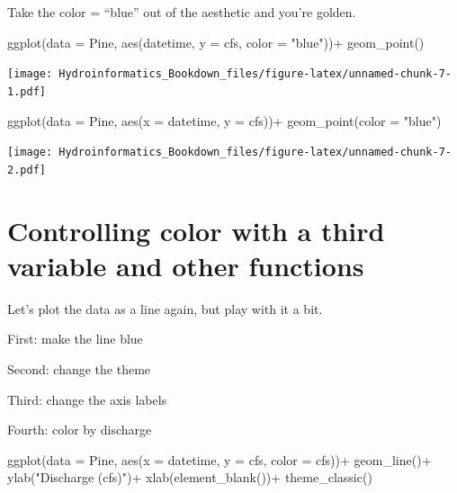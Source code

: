 \documentclass[
]{book}
\newenvironment{Shaded}{\begin{snugshade}}{\end{snugshade}}
\newcommand{\AttributeTok}[1]{\textcolor[rgb]{0.77,0.63,0.00}{#1}}
\newcommand{\FunctionTok}[1]{\textcolor[rgb]{0.00,0.00,0.00}{#1}}
\newcommand{\NormalTok}[1]{#1}
\newcommand{\SpecialCharTok}[1]{\textcolor[rgb]{0.00,0.00,0.00}{#1}}
\newcommand{\StringTok}[1]{\textcolor[rgb]{0.31,0.60,0.02}{#1}}
\begin{document}
Take the color = ``blue'' out of the aesthetic and you're golden.

\begin{Shaded}
\begin{Highlighting}[]
\FunctionTok{ggplot}\NormalTok{(}\AttributeTok{data =}\NormalTok{ Pine, }\FunctionTok{aes}\NormalTok{(datetime, }\AttributeTok{y =}\NormalTok{ cfs, }\AttributeTok{color =} \StringTok{"blue"}\NormalTok{))}\SpecialCharTok{+}
  \FunctionTok{geom\_point}\NormalTok{()}
\end{Highlighting}
\end{Shaded}

\texttt{[image: Hydroinformatics\_Bookdown\_files/figure-latex/unnamed-chunk-7-1.pdf]}

\begin{Shaded}
\begin{Highlighting}[]
\FunctionTok{ggplot}\NormalTok{(}\AttributeTok{data =}\NormalTok{ Pine, }\FunctionTok{aes}\NormalTok{(}\AttributeTok{x =}\NormalTok{ datetime, }\AttributeTok{y =}\NormalTok{ cfs))}\SpecialCharTok{+}
  \FunctionTok{geom\_point}\NormalTok{(}\AttributeTok{color =} \StringTok{"blue"}\NormalTok{)}
\end{Highlighting}
\end{Shaded}

\texttt{[image: Hydroinformatics\_Bookdown\_files/figure-latex/unnamed-chunk-7-2.pdf]}

\hypertarget{controlling-color-with-a-third-variable-and-other-functions}{%
\section{Controlling color with a third variable and other functions}\label{controlling-color-with-a-third-variable-and-other-functions}}

Let's plot the data as a line again, but play with it a bit.

First: make the line blue

Second: change the theme

Third: change the axis labels

Fourth: color by discharge

\begin{Shaded}
\begin{Highlighting}[]
\FunctionTok{ggplot}\NormalTok{(}\AttributeTok{data =}\NormalTok{ Pine, }\FunctionTok{aes}\NormalTok{(}\AttributeTok{x =}\NormalTok{ datetime, }\AttributeTok{y =}\NormalTok{ cfs, }\AttributeTok{color =}\NormalTok{ cfs))}\SpecialCharTok{+}
  \FunctionTok{geom\_line}\NormalTok{()}\SpecialCharTok{+}
  \FunctionTok{ylab}\NormalTok{(}\StringTok{"Discharge (cfs)"}\NormalTok{)}\SpecialCharTok{+}
  \FunctionTok{xlab}\NormalTok{(}\FunctionTok{element\_blank}\NormalTok{())}\SpecialCharTok{+}
  \FunctionTok{theme\_classic}\NormalTok{()}
\end{Highlighting}
\end{Shaded}
\end{document}
